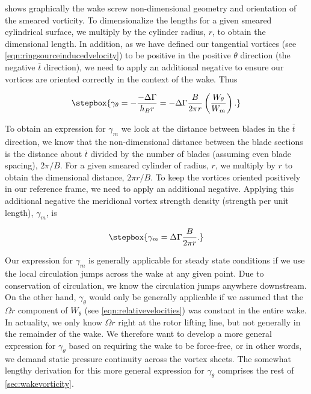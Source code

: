  shows graphically the wake screw non-dimensional geometry and orientation of the smeared vorticity.
%
To dimensionalize the lengths for a given smeared cylindrical surface, we multiply by the cylinder radius, \(r\), to obtain the dimensional length.
%
In addition, as we have defined our tangential vortices (see \cref{eqn:ringsourceinducedvelocity}) to be positive in the positive \(\theta\) direction (the negative \(\overline{t}\) direction), we need to apply an additional negative to ensure our vortices are oriented correctly in the context of the wake.
%
Thus

\begin{equation}
    \label{eqn:gammat1}
    \stepbox{
    \gamma_\theta = -\frac{-\Delta\Gamma}{h_B r} = -\Delta \Gamma \frac{B }{2 \pi r} \left(\frac{W_\theta}{W_m}\right).
}
\end{equation}

To obtain an expression for \(\gamma_m\) we look at the distance between blades in the \(\overline{t}\) direction, we know that the non-dimensional distance between the blade sections is the distance about \(\overline{t}\) divided by the number of blades (assuming even blade spacing), \(2\pi/B\).
%
For a given smeared cylinder of radius, \(r\), we multiply by \(r\) to obtain the dimensional distance, \(2\pi r/B\).
%
To keep the vortices oriented positively in our reference frame, we need to apply an additional negative.%
%
Applying this additional negative the meridional vortex strength density (strength per unit length), \(\gamma_m\), is

\begin{equation}
    \label{eqn:gammam1}
    \stepbox{
    \gamma_m = \Delta\Gamma \frac{B}{2 \pi r}.
}
\end{equation}


Our expression for \(\gamma_m\) is generally applicable for steady state conditions if we use the local circulation jumps across the wake at any given point.
%
Due to conservation of circulation, we know the circulation jumps anywhere downstream.
%
On the other hand, \(\gamma_\theta\) would only be generally applicable if we assumed that the \(\Omega r\) component of \(W_\theta\) (see \cref{eqn:relativevelocities}) was constant in the entire wake.
%
In actuality, we only know \(\Omega r\) right at the rotor lifting line, but not generally in the remainder of the wake.
%
We therefore want to develop a more general expression for \(\gamma_\theta\) based on requiring the wake to be force-free, or in other words, we demand static pressure continuity across the vortex sheets.
%
The somewhat lengthy derivation for this more general expression for \(\gamma_\theta\) comprises the rest of \cref{sec:wakevorticity}.

